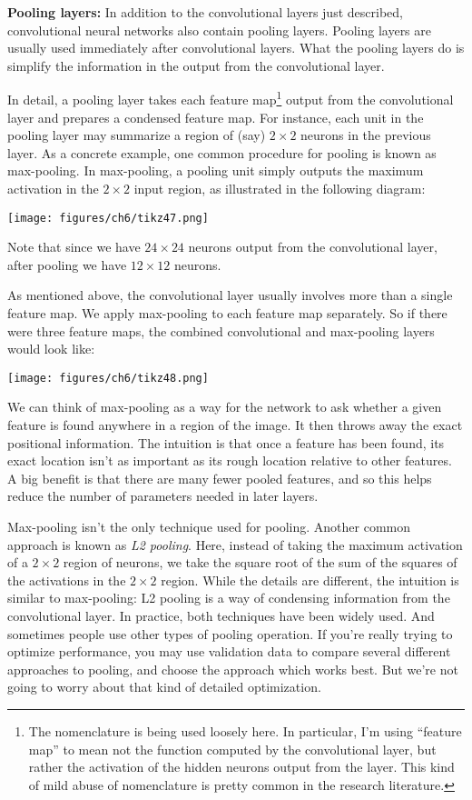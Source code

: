 \documentclass[a4paper,twoside,10pt]{book}
\begin{document}
\textbf{Pooling layers:} In addition to the convolutional layers just described, convolutional neural networks also contain pooling layers. Pooling layers are usually used immediately after convolutional layers. What the pooling layers do is simplify the information in the output from the convolutional layer.

In detail, a pooling layer takes each feature map\footnote{The nomenclature is being used loosely here. In particular, I'm using ``feature map'' to mean not the function computed by the convolutional layer, but rather the activation of the hidden neurons output from the layer. This kind of mild abuse of nomenclature is pretty common in the research literature.} output from the convolutional layer and prepares a condensed feature map. For instance, each unit in the pooling layer may summarize a region of (say) $2\times2$ neurons in the previous layer. As a concrete example, one common procedure for pooling is known as max-pooling. In max-pooling, a pooling unit simply outputs the maximum activation in the $2\times2$ input region, as illustrated in the following diagram:
\begin{center}
	\texttt{[image: figures/ch6/tikz47.png]}
\end{center}
Note that since we have $24\times24$ neurons output from the convolutional layer, after pooling we have $12\times12$ neurons.

As mentioned above, the convolutional layer usually involves more than a single feature map. We apply max-pooling to each feature map separately. So if there were three feature maps, the combined convolutional and max-pooling layers would look like:
\begin{center}
	\texttt{[image: figures/ch6/tikz48.png]}
\end{center}
We can think of max-pooling as a way for the network to ask whether a given feature is found anywhere in a region of the image. It then throws away the exact positional information. The intuition is that once a feature has been found, its exact location isn't as important as its rough location relative to other features. A big benefit is that there are many fewer pooled features, and so this helps reduce the number of parameters needed in later layers.

Max-pooling isn't the only technique used for pooling. Another common approach is known as \textit{L2 pooling}. Here, instead of taking the maximum activation of a $2\times2$ region of neurons, we take the square root of the sum of the squares of the activations in the $2\times2$ region. While the details are different, the intuition is similar to max-pooling: L2 pooling is a way of condensing information from the convolutional layer. In practice, both techniques have been widely used. And sometimes people use other types of pooling operation. If you're really trying to optimize performance, you may use validation data to compare several different approaches to pooling, and choose the approach which works best. But we're not going to worry about that kind of detailed optimization.
\end{document}
